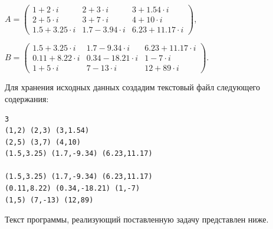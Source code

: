  $A=\left(\begin{array}{rrr}1+2\cdot i&2+3\cdot i&3+1.54\cdot i\\2+5\cdot i&3+7\cdot i&4+10\cdot i\\1.5+3.25\cdot
i&1.7-3.94\cdot i&6.23+11.17\cdot i\end{array}\right)$,

 $B=\left(\begin{array}{rrr}1.5+3.25\cdot i&1.7-9.34\cdot i&6.23+11.17\cdot i\\0.11+8.22\cdot i&0.34-18.21\cdot i&1-7\cdot
i\\1+5\cdot i&7-13\cdot i&12+89\cdot i\end{array}\right)$.

Для хранения исходных данных создадим текстовый файл  %
следующего содержания:
\label{ch09:file1}\begin{verbatim}
3
(1,2) (2,3) (3,1.54)
(2,5) (3,7) (4,10)
(1.5,3.25) (1.7,-9.34) (6.23,11.17)

(1.5,3.25) (1.7,-9.34) (6.23,11.17)
(0.11,8.22) (0.34,-18.21) (1,-7)
(1,5) (7,-13) (12,89)
\end{verbatim}

Текст программы, реализующий поставленную задачу представлен ниже. 

